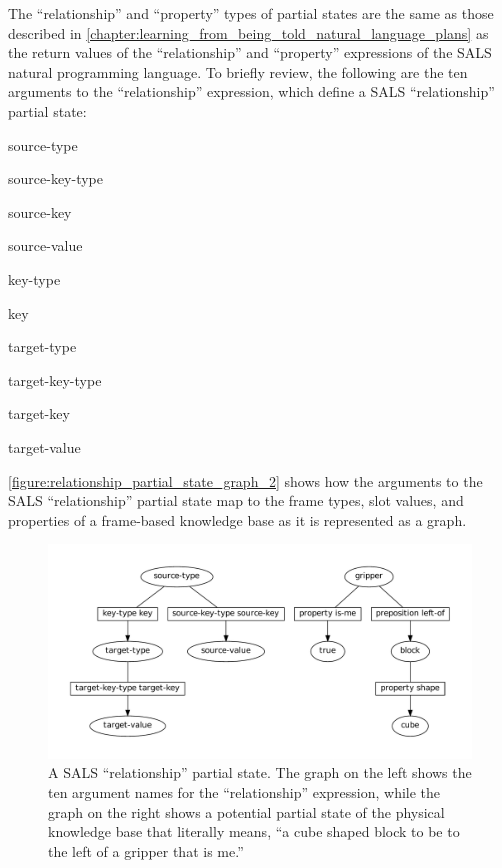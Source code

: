 The ``relationship'' and ``property'' types of partial states are the
same as those described in
{\mbox{\autoref{chapter:learning_from_being_told_natural_language_plans}}}
as the return values of the ``relationship'' and ``property''
expressions of the SALS natural programming language.  To briefly
review, the following are the ten arguments to the ``relationship''
expression, which define a SALS ``relationship'' partial state:
\begin{packed_enumerate}
\item{source-type}
\item{source-key-type}
\item{source-key}
\item{source-value}
\item{key-type}
\item{key}
\item{target-type}
\item{target-key-type}
\item{target-key}
\item{target-value}
\end{packed_enumerate}
{\mbox{\autoref{figure:relationship_partial_state_graph_2}}} shows how
the arguments to the SALS ``relationship'' partial state map to the
frame types, slot values, and properties of a frame-based knowledge
base as it is represented as a graph.
\begin{figure}
\centering
\includegraphics[width=12cm]{gfx/relationship_partial_state_graph}
\caption[A SALS ``relationship'' partial state.]{A SALS
  ``relationship'' partial state.  The graph on the left shows the ten
  argument names for the ``relationship'' expression, while the graph
  on the right shows a potential partial state of the physical
  knowledge base that literally means, ``a cube shaped block to be to
  the left of a gripper that is me.''}
\label{figure:relationship_partial_state_graph_2}
\end{figure}


